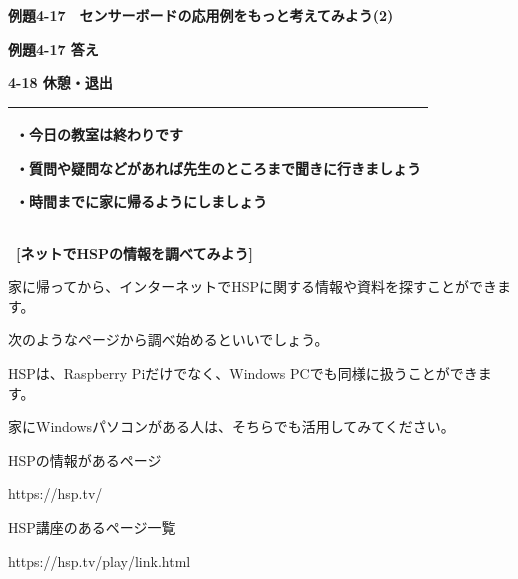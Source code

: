 \documentclass[a4paper,dvipdfmx]{jarticle}
\newcommand\textstyleqwerty[1]{#1}
\begin{document}
\bigskip


\bigskip


\bigskip


\bigskip


\bigskip

\textstyleqwerty{\textbf{例題4-17　センサーボードの応用例をもっと考えてみよう(2)}}

{\bfseries
例題4-17 答え}


\bigskip


\bigskip


\bigskip


\bigskip


\bigskip


\bigskip


\bigskip


\bigskip


\bigskip

{\bfseries
4-18 休憩・退出}


\bigskip

\begin{flushleft}
\tablefirsthead{}
\tablehead{}
\tabletail{}
\tablelasttail{}
\begin{supertabular}{|m{10.542cm}|}
\hline
・今日の教室は終わりです

・質問や疑問などがあれば先生のところまで聞きに行きましょう

・時間までに家に帰るようにしましょう\\\hline
\end{supertabular}
\end{flushleft}

\bigskip

{\bfseries
\ [ネットでHSPの情報を調べてみよう]}


\bigskip

家に帰ってから、インターネットでHSPに関する情報や資料を探すことができます。

次のようなページから調べ始めるといいでしょう。

HSPは、Raspberry Piだけでなく、Windows
PCでも同様に扱うことができます。

家にWindowsパソコンがある人は、そちらでも活用してみてください。


\bigskip

HSPの情報があるページ

https://hsp.tv/


\bigskip

HSP講座のあるページ一覧

https://hsp.tv/play/link.html
\end{document}
